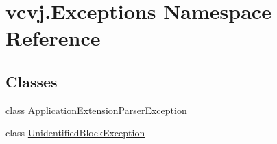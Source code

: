 \hypertarget{namespacevcvj_1_1_exceptions}{}\section{vcvj.\+Exceptions Namespace Reference}
\label{namespacevcvj_1_1_exceptions}
\subsection*{Classes}
\begin{DoxyCompactItemize}
\item 
class \hyperlink{classvcvj_1_1_exceptions_1_1_application_extension_parser_exception}{Application\+Extension\+Parser\+Exception}
\item 
class \hyperlink{classvcvj_1_1_exceptions_1_1_unidentified_block_exception}{Unidentified\+Block\+Exception}
\end{DoxyCompactItemize}
